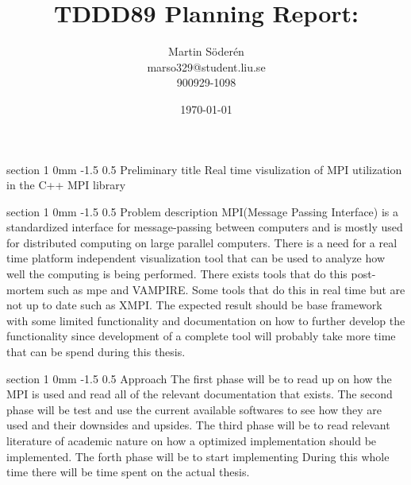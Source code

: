 \documentclass[a4paper,11pt]{article}
\makeatletter
\renewcommand{\section}{\@startsection
   {section}%
   {1}%
   {0mm}%
   {-1.5\baselineskip}%
   {0.5\baselineskip}%
   {\sffamily\bfseries\upshape\normalsize}}%
\makeatother
\begin{document}
\begin{titlepage}
\title{TDDD89 Planning Report:}
\author{Martin Söderén\\ marso329@student.liu.se\\900929-1098}
\date{\today}
\maketitle
\vfill %
\thispagestyle{empty}
\end{titlepage}
\section{Preliminary title}
Real time visulization of MPI utilization in the C++ MPI library 

\section{Problem description}
MPI(Message Passing Interface) is a standardized interface for message-passing between computers and is mostly used for distributed computing on large parallel computers. There is a need for a real time platform independent visualization tool that can be used to analyze how well the computing is being performed. There exists tools that do this post-mortem such as mpe and VAMPIRE. Some tools that do this in real time but are not up to date such as XMPI.
\newline
\newline
The expected result should be base framework with some limited functionality and documentation on how to further develop the functionality since development of a complete tool will probably take more time that can be spend during this thesis.

\section{Approach}
The first phase will be to read up on how the MPI is used and read all of the relevant documentation that exists.
\newline
\newline
The second phase will be test and use the current available softwares to see how they are used and their downsides and upsides.
\newline
\newline
The third phase will be to read relevant literature of academic nature on how a optimized implementation should be implemented.
\newline
\newline
The forth phase will be to start implementing
\newline
\newline
During this whole time there will be time spent on the actual thesis. 
\end{document}
